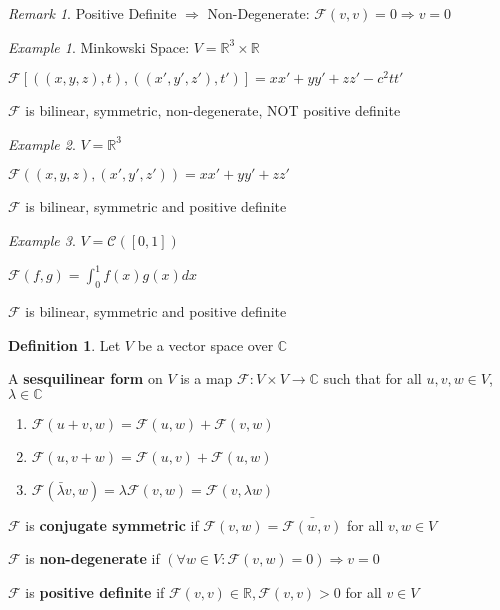 \documentclass[11pt, a4paper]{report}
\numberwithin{equation}{section}
\newcommand{\R}{\mathbb{R}}
\newcommand{\C}{\mathbb{C}}
\newcommand{\Fc}{\mathcal{F}}
\numberwithin{equation}{subsection}
\theoremstyle{plain}
\theoremstyle{definition}
\newtheorem{defn}{Definition}[chapter]
\theoremstyle{remark}
\newtheorem*{rem}{Remark}
\newtheorem{exmp}{Example}[chapter]
\begin{document}
\begin{rem} {\sc Positive Definite $\Rightarrow$ Non-Degenerate}: $\Fc(v,v) = 0 \Rightarrow v = 0$\\ \end{rem}

\begin{exmp} Minkowski Space: $V = \R^3 \times \R$

$\Fc \left[ ((x,y,z),t),((x',y',z'),t') \right] = xx' + yy' + zz' - c^2tt'$

$\Fc$ is bilinear, symmetric, non-degenerate, NOT positive definite\\
\end{exmp}

\begin{exmp}
$V = \R^3$

$\Fc((x,y,z),(x',y',z')) = xx' + yy' + zz'$

$\Fc$ is bilinear, symmetric and positive definite\\
\end{exmp}

\begin{exmp}
$V = \mathcal{C}([0,1])$

$\Fc(f,g) = \int_0^1 f(x) g(x) dx$

$\Fc$ is bilinear, symmetric and positive definite
\end{exmp}

\newpage

\begin{defn}
Let $V$ be a vector space over $\C$

A \textbf{sesquilinear form} on $V$ is a map $\Fc : V \times V \to \C$ such that for all $u,v,w \in V$, $\lambda \in \C$

\begin{adjustwidth}{1cm}{}
\begin{enumerate}[(1) ]
\item $\Fc(u + v, w) = \Fc(u,w) + \Fc(v,w)$
\item $\Fc(u, v + w) = \Fc(u,v) + \Fc(u,w)$
\item $\Fc(\bar{\lambda} v, w) = \lambda \Fc(v,w) = \Fc(v, \lambda w)$
\end{enumerate}
\end{adjustwidth}
$\Fc$ is \textbf{conjugate symmetric} if $\Fc(v,w) = \bar{\Fc(w,v)}$ for all $v,w \in V$

$\Fc$ is \textbf{non-degenerate} if $(\forall w \in V: \Fc(v,w) = 0) \Rightarrow v = 0$
 
$\Fc$ is \textbf{positive definite} if $\Fc(v,v) \in \R, \Fc(v,v) > 0$ for all $v \in V$\\
\end{defn}
\end{document}
